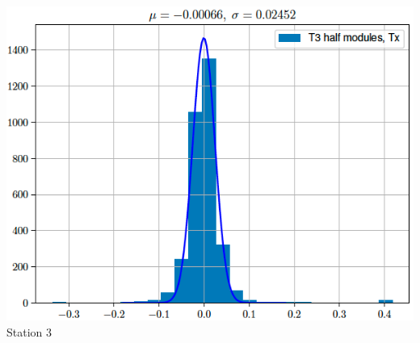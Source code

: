 \documentclass[aspectratio=1610, 12pt, xcolor=dvipsnames]{beamer}
\begin{document}
\begin{frame}
\begin{columns}
\begin{column}[c]{0.33\textwidth}
      \includegraphics[width=\textwidth]{plots/2025_plots_precision/T3.png}
      Station 3
    \end{column}
  \end{columns}
\end{frame}
\end{document}
